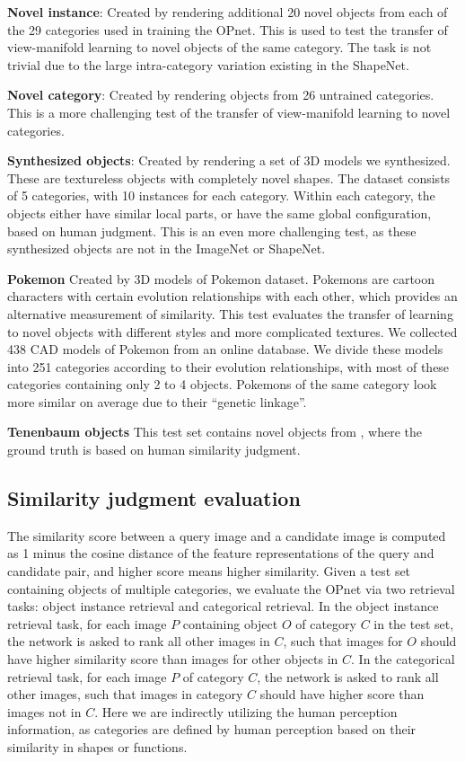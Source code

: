 \documentclass{article} %
\begin{document}
\textbf{Novel instance}: Created by rendering additional 20 novel objects from each of the 29 categories used in training the OPnet. This is used to test the transfer of view-manifold learning to novel objects of the same category. The task is not trivial due to the large intra-category variation existing in the ShapeNet.

\textbf{Novel category}: Created by rendering objects from 26 untrained categories. This is a more challenging test of the transfer of view-manifold learning to novel categories.

\textbf{Synthesized objects}: Created by rendering a set of 3D models we synthesized. These are textureless objects with completely novel shapes. The dataset consists of 5 categories, with 10 instances for each category. Within each category, the objects  either have similar local parts, or have the same global configuration, based on human judgment. This is an even more challenging test, as these synthesized objects are not in the ImageNet or ShapeNet.

\textbf{Pokemon} Created by 3D models of Pokemon dataset. Pokemons are cartoon characters  with certain evolution relationships with each other, which provides an alternative measurement of similarity. This test evaluates the transfer of learning to novel objects with different styles and more complicated textures.
We collected 438 CAD models of Pokemon from an online database. We divide these models into 251 categories according to their evolution relationships, with most of these categories containing only 2 to 4 objects.  Pokemons of the same category look more similar on average due to their ``genetic linkage''.

\textbf{Tenenbaum objects} This test set contains novel objects from \citet{tenenbaum2011grow}, where the ground truth is based on human similarity judgment.

\subsection{Similarity judgment evaluation}

The similarity score between a query image and a candidate image is computed as 1 minus the cosine distance of the feature representations of the query and candidate pair, and higher score means higher similarity. Given a test set containing objects of multiple categories, we evaluate the OPnet via two retrieval tasks: object instance retrieval and categorical retrieval. In the object instance retrieval task, for each image $P$ containing object $O$ of category $C$ in the test set, the network is asked to rank all other images in $C$, such that images for $O$ should have higher similarity score than images for other objects in $C$. In the categorical retrieval task, for each image $P$ of category $C$, the network is asked to rank all other images, such that images in category $C$ should have higher score than images not in $C$. Here we are indirectly utilizing the human perception information, as categories are defined by human perception based on their similarity in shapes or functions.
\end{document}
